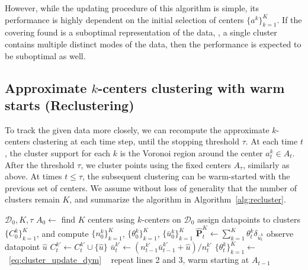 However, while the updating procedure of this algorithm is simple, its performance is highly dependent on the initial selection of centers $\{a^k\}_{k=1}^K$. If the covering found is a suboptimal representation of the data, \ie, a single cluster contains multiple distinct modes of the data, then the performance is expected to be suboptimal as well. 




\subsection{Approximate $k$-centers clustering with warm starts (Reclustering)}

To track the given data more closely, we can recompute the approximate $k$-centers clustering at each time step, until the stopping threshold $\tau$.
At each time $t$, the cluster support for each $k$ is the Voronoi region around the center $a_t^k \in A_t$.
After the threshold $\tau$, we cluster points using the fixed centers $A_\tau$, similarly as above. 
At times $t\leq \tau $, the subsequent clustering can be warm-started with the previous set of centers. We assume without loss of generality that the number of clusters remain $K$, and summarize the algorithm in Algorithm~\ref{alg:recluster}. 
\begin{algorithm}[ht]
	\caption{Reclustering}
	\label{alg:recluster}
	\begin{algorithmic}[1]
	  $\mathcal{D}_0, K,\tau$ 
     \State $A_0 \gets$ find $K$ centers using $k$-centers on $\mathcal{D}_0$
     \State assign datapoints to clusters $\{C^k_0\}_{k=1}^K$, and compute $\{n^k_0\}_{k=1}^K$, $\{\theta^k_0\}_{k=1}^K$, $\{\bar{u}_0^k\}_{k=1}^K$
\State  $\hat{\mathbf{P}}^K_t \gets \sum_{k=1}^{K}\theta_t^k\delta_{\bar{u}_t^k}$
\State observe datapoint $\hat{u}$
\State $C_t^{k'} \gets C_t^{k'} \cup \{\hat{u}\}$ 
     \State $\bar{u}^{k'}_t \gets (n^{k'}_{t-1}\bar{u}^{k'}_{t-1} + \hat{u})/n^{k'}_t$ 
     \State $\{\theta^k_t\}_{k=1}^K \gets$~\eqref{eq:cluster_update_dym} 
\Else~
    repeat lines 2 and 3, warm starting at $A_{t-1}$
    \EndIf
  \EndFor
	\end{algorithmic}
\end{algorithm} 

